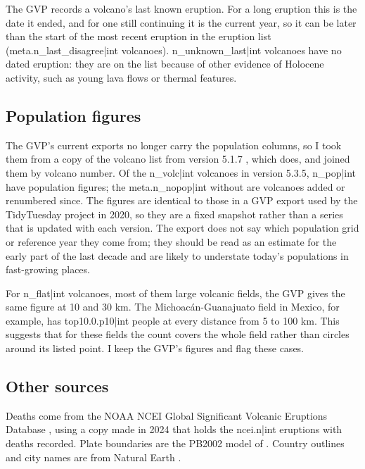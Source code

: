 \documentclass[11pt,a4paper]{article}
\begin{document}
The GVP records a volcano's last known eruption. For a long eruption this is the date it ended, and for one still continuing it is the current year, so it can be later than the start of the most recent eruption in the eruption list ({{meta.n_last_disagree|int}} volcanoes). {{n_unknown_last|int}} volcanoes have no dated eruption: they are on the list because of other evidence of Holocene activity, such as young lava flows or thermal features.

\subsection{Population figures}
The GVP's current exports no longer carry the population columns, so I took them from a copy of the volcano list from version 5.1.7 \citep{gvp517}, which does, and joined them by volcano number. Of the {{n_volc|int}} volcanoes in version 5.3.5, {{n_pop|int}} have population figures; the {{meta.n_nopop|int}} without are volcanoes added or renumbered since. The figures are identical to those in a GVP export used by the TidyTuesday project in 2020, so they are a fixed snapshot rather than a series that is updated with each version. The export does not say which population grid or reference year they come from; they should be read as an estimate for the early part of the last decade and are likely to understate today's populations in fast-growing places.

For {{n_flat|int}} volcanoes, most of them large volcanic fields, the GVP gives the same figure at 10 and 30 km. The Michoac\'an-Guanajuato field in Mexico, for example, has {{top10.0.p10|int}} people at every distance from 5 to 100 km. This suggests that for these fields the count covers the whole field rather than circles around its listed point. I keep the GVP's figures and flag these cases.

\subsection{Other sources}
Deaths come from the NOAA NCEI Global Significant Volcanic Eruptions Database \citep{ncei}, using a copy made in 2024 that holds the {{ncei.n|int}} eruptions with deaths recorded. Plate boundaries are the PB2002 model of \citet{bird2003}. Country outlines and city names are from Natural Earth \citep{naturalearth}.
\end{document}
